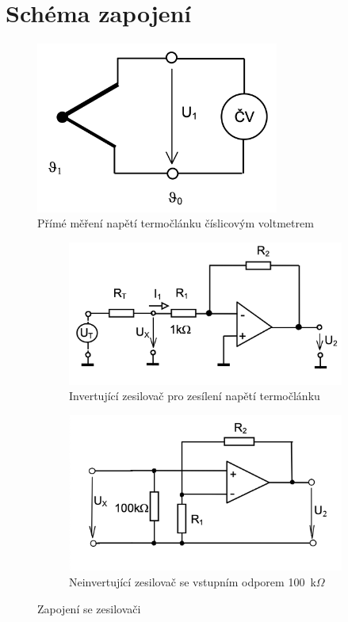 \documentclass[a4paper,12pt]{article}   %
\begin{document}
\section{Schéma zapojení}
\label{schema_zapojeni}
\begin{figure}
    \centering
    \includegraphics[width=8cm]{prime.png}
    \caption{Přímé měření napětí termočlánku číslicovým voltmetrem}
    \label{fig:prime}
\end{figure}


\begin{figure}[hbtp]
\centering
\begin{subfigure}{.5\textwidth}
    \centering  
    \captionsetup{width=.8\linewidth}
    \includegraphics[width=\textwidth]{invert.png} 
    \caption{Invertující zesilovač pro zesílení napětí termočlánku}
    \label{fig:invert}
\end{subfigure}%
\begin{subfigure}{.5\textwidth}
    \centering
      \captionsetup{width=.8\linewidth}
    \includegraphics[width=\textwidth]{neinvert.png}
    \caption{Neinvertující zesilovač se vstupním odporem 100~k$\Omega$}
    \label{fig:neinvert}        
\end{subfigure}
\caption{Zapojení se zesilovači}
\label{fig:test}
\end{figure}
\end{document}
